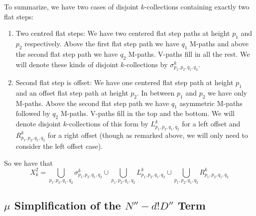\documentclass[11pt]{article}
\theoremstyle{mythm}
\begin{document}
To summarize, we have two cases of disjoint $k$-collections containing exactly two flat steps:
\begin{enumerate}[label=(\alph*)]
\item Two centred flat steps: We have two centered flat step paths at height $p_1$ and $p_2$ respectively. Above the first flat step path we have $q_1$ M-paths and above the second flat step path we have $q_2$ M-paths. V-paths fill in all the rest. We will denote these kinds of disjoint $k$-collections by $\sigma_{p_1,p_2,q_1,q_2}^k$.
\item Second flat step is offset: We have one centered flat step path at height $p_1$ and an offset flat step path at height $p_2$. In between $p_1$ and $p_2$ we have only M-paths. Above the second flat step path we have $q_1$ asymmetric M-paths followed by $q_2$ M-paths. V-paths fill in the top and the bottom. We will denote disjoint $k$-collections of this form by $L_{p_1,p_2,q_1,q_2}^k$ for a left offset and $R_{p_1,p_2,q_1,q_2}^k$ for a right offset (though as remarked above, we will only need to consider the left offset case).
\end{enumerate}

So we have that
\begin{equation*}
X_{k}^2 = \bigcup\limits_{p_1,p_2,q_1,q_2}\sigma_{p_1,p_2,q_1,q_2}^k \cup \bigcup\limits_{p_1,p_2,q_1,q_2}L_{p_1,p_2,q_1,q_2}^k \cup \bigcup\limits_{p_1,p_2,q_1,q_2}R_{p_1,p_2,q_1,q_2}^k
\end{equation*}

\subsection{$\mu$ Simplification of the $N''-d!D''$ Term}
\end{document}
